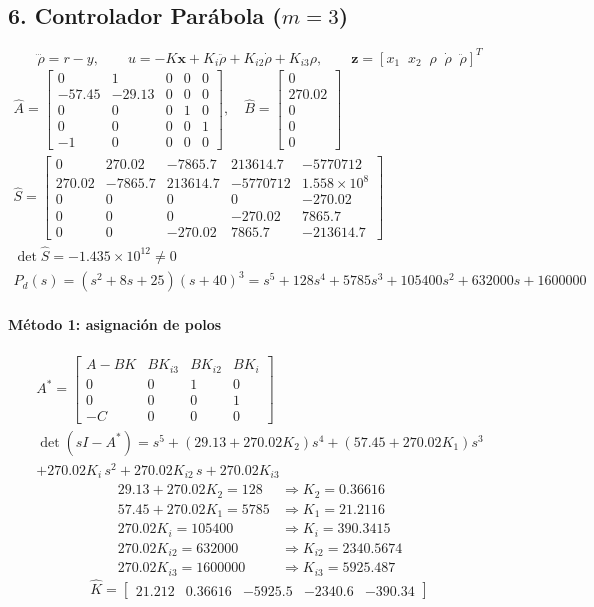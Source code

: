 \documentclass[11pt]{article}
\begin{document}
\subsection*{6. Controlador Parábola ($m=3$)}
\[\dddot\rho=r-y,\qquad u=-K\mathbf{x}+K_i\ddot\rho+K_{i2}\dot\rho+K_{i3}\rho,\qquad \mathbf{z}=[x_1\;\;x_2\;\;\rho\;\;\dot\rho\;\;\ddot\rho]^T\]
\begin{gather*}
\hat{A}=\begin{bmatrix}0 & 1 & 0 & 0 & 0 \\ -57.45 & -29.13 & 0 & 0 & 0 \\ 0 & 0 & 0 & 1 & 0 \\ 0 & 0 & 0 & 0 & 1 \\ -1 & 0 & 0 & 0 & 0\end{bmatrix},\quad \hat{B}=\begin{bmatrix}0 \\ 270.02 \\ 0 \\ 0 \\ 0\end{bmatrix}\\
\hat{S}=\begin{bmatrix}0 & 270.02 & -7865.7 & 213614.7 & -5770712 \\ 270.02 & -7865.7 & 213614.7 & -5770712 & 1.558\times10^{8} \\ 0 & 0 & 0 & 0 & -270.02 \\ 0 & 0 & 0 & -270.02 & 7865.7 \\ 0 & 0 & -270.02 & 7865.7 & -213614.7\end{bmatrix}\\
\det\hat{S}=-1.435\times10^{12}\neq0\\
P_d(s)=(s^2+8s+25)(s+40)^3=s^{5} + 128s^{4} + 5785s^{3} + 105400s^{2} + 632000s + 1600000
\end{gather*}
\paragraph{Método 1: asignación de polos}
\begin{gather*}
A^*=\begin{bmatrix}A-BK&BK_{i3}&BK_{i2}&BK_i\\0&0&1&0\\0&0&0&1\\-C&0&0&0\end{bmatrix}\\
\det(sI-A^*)=s^5+(29.13+270.02K_2)s^4+(57.45+270.02K_1)s^3\\+270.02K_i\,s^2+270.02K_{i2}\,s+270.02K_{i3}
\end{gather*}
\begin{align*}
29.13+270.02K_2=128 &\Rightarrow K_2=0.36616\\
57.45+270.02K_1=5785 &\Rightarrow K_1=21.2116\\
270.02K_i=105400 &\Rightarrow K_i=390.3415\\
270.02K_{i2}=632000 &\Rightarrow K_{i2}=2340.5674\\
270.02K_{i3}=1600000 &\Rightarrow K_{i3}=5925.487
\end{align*}
\[\hat{K}=\begin{bmatrix}21.212 & 0.36616 & -5925.5 & -2340.6 & -390.34\end{bmatrix}\]
\end{document}
